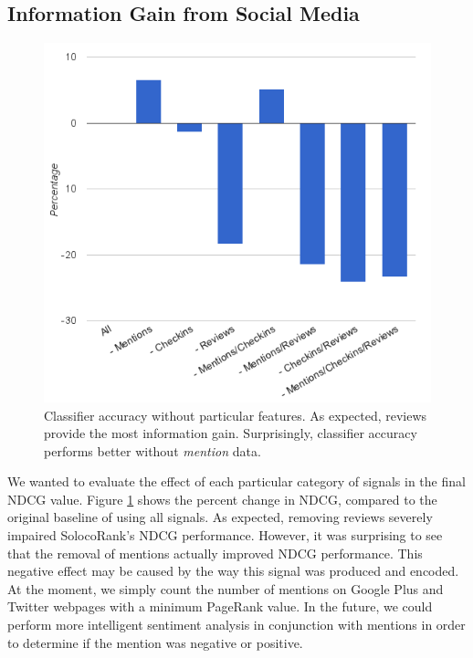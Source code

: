 \subsection{Information Gain from Social Media}
\begin{figure}[h]
  \includegraphics[width=.5\textwidth]{fig/signalselection-accuracy.png}
  \caption{Classifier accuracy without particular features. As expected,
  reviews provide the most information gain. Surprisingly, classifier
  accuracy performs better without \emph{mention} data.}
  \label{fig:signalselection-accuracy}
\end{figure}

We wanted to evaluate the effect of each particular category of signals in 
the final NDCG value.
Figure \ref{fig:signalselection-accuracy} shows the percent change in NDCG, 
compared to the original baseline of using all signals.
As expected, removing reviews severely impaired SolocoRank's NDCG performance.
However, it was surprising to see that the removal of mentions actually improved
NDCG performance.
This negative effect may be caused by the way this signal was produced and encoded.
At the moment, we simply count the number of mentions on Google Plus
and Twitter webpages with a minimum PageRank value.
In the future, we could perform more intelligent sentiment analysis in conjunction with
mentions in order to determine if the mention was negative or positive.
